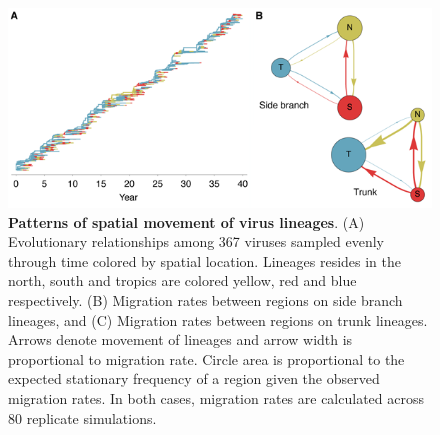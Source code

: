 \documentclass[11pt,oneside,letterpaper]{article}
\begin{document}
\begin{figure}[H]
	\centering
	\includegraphics{figures/spatial}
	\caption{\textbf{Patterns of spatial movement of virus lineages}. (A) Evolutionary relationships among 367 viruses sampled evenly through time colored by spatial location. Lineages resides in the north, south and tropics are colored yellow, red and blue respectively. (B) Migration rates between regions on side branch lineages, and (C) Migration rates between regions on trunk lineages. Arrows denote movement of lineages and arrow width is proportional to migration rate. Circle area is proportional to the expected stationary frequency of a region given the observed migration rates.  In both cases, migration rates are calculated across 80 replicate simulations.}
	\label{spatial}
\end{figure}
\end{document}
